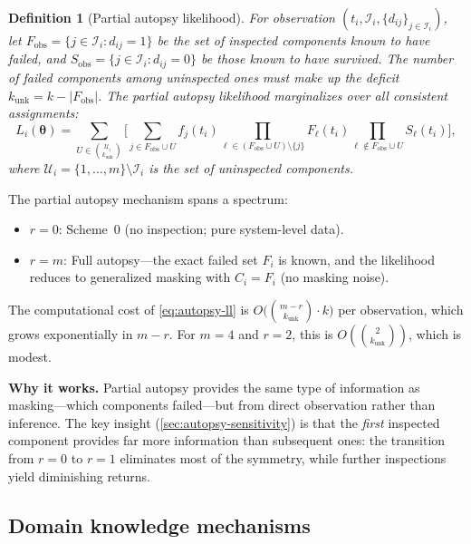\documentclass[12pt]{article}
\newtheorem{definition}{Definition}
\newcommand{\btheta}{\boldsymbol{\theta}}
\begin{document}
\begin{definition}[Partial autopsy likelihood]\label{def:autopsy-ll}
For observation $(t_i, \mathcal{I}_i, \{d_{ij}\}_{j \in \mathcal{I}_i})$,
let $F_{\text{obs}} = \{j \in \mathcal{I}_i : d_{ij} = 1\}$ be the
set of inspected components known to have failed, and
$S_{\text{obs}} = \{j \in \mathcal{I}_i : d_{ij} = 0\}$ be those known
to have survived.  The number of failed components among uninspected
ones must make up the deficit $k_{\text{unk}} = k - |F_{\text{obs}}|$.
The partial autopsy likelihood marginalizes over all consistent
assignments:
\begin{equation}\label{eq:autopsy-ll}
  L_i(\btheta) = \sum_{U \in \binom{\mathcal{U}_i}{k_\text{unk}}}
    \biggl[\sum_{j \in F_\text{obs} \cup U}
      f_j(t_i) \!\!\!\prod_{\ell \in (F_\text{obs} \cup U) \setminus \{j\}}
      \!\!\! F_\ell(t_i)
      \prod_{\ell \notin F_\text{obs} \cup U} S_\ell(t_i)\biggr],
\end{equation}
where $\mathcal{U}_i = \{1, \ldots, m\} \setminus \mathcal{I}_i$ is
the set of uninspected components.
\end{definition}

The partial autopsy mechanism spans a spectrum:
\begin{itemize}
  \item $r = 0$: Scheme~0 (no inspection; pure system-level data).
  \item $r = m$: Full autopsy---the exact failed set $F_i$ is
    known, and the likelihood reduces to generalized masking with
    $C_i = F_i$ (no masking noise).
\end{itemize}

The computational cost of \eqref{eq:autopsy-ll} is
$O\bigl(\binom{m-r}{k_{\text{unk}}} \cdot k\bigr)$ per observation,
which grows exponentially in $m - r$.  For $m = 4$ and $r = 2$, this
is $O(\binom{2}{k_{\text{unk}}})$, which is modest.

\textbf{Why it works.}
Partial autopsy provides the same type of information as masking---which
components failed---but from direct observation rather than inference.
The key insight (\cref{sec:autopsy-sensitivity}) is that the \emph{first}
inspected component provides far more information than subsequent ones:
the transition from $r = 0$ to $r = 1$ eliminates most of the symmetry,
while further inspections yield diminishing returns.

\subsection{Domain knowledge mechanisms}\label{sec:domain}
\end{document}
